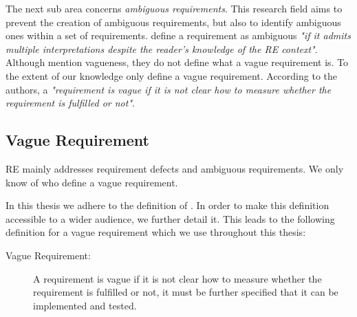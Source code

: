The next sub area concerns \textit{ambiguous requirements}.
This research field aims to prevent the creation of ambiguous requirements, but also to identify ambiguous ones within a set of requirements.
\Textcite{Kamsties:2000} define a requirement as ambiguous \textit{"if it admits multiple interpretations despite the reader’s knowledge of the RE context"}.
Although \textcite{Kamsties:2000} mention vagueness, they do not define what a vague requirement is.
To the extent of our knowledge only \textcite{Berry:2003} define a vague requirement.
According to the authors, a \textit{"requirement is vague if it is not clear how to measure whether the requirement is fulfilled or not"}.

\subsection{Vague Requirement}
\label{chp:fundamentals:sec:vagueness:subsec:vague_requirement}
\Ac{RE} mainly addresses requirement defects and ambiguous requirements.
We only know of \textcite{Berry:2003} who define a vague requirement.

In this thesis we adhere to the definition of \textcite{Berry:2003}.
In order to make this definition accessible to a wider audience, we further detail it.
This leads to the following definition for a vague requirement which we use throughout this thesis:
\begin{description}
    \item[Vague Requirement:] A requirement is vague if it is not clear how to measure whether the requirement is fulfilled or not, it must be further specified that it can be implemented and tested.
\end{description}
